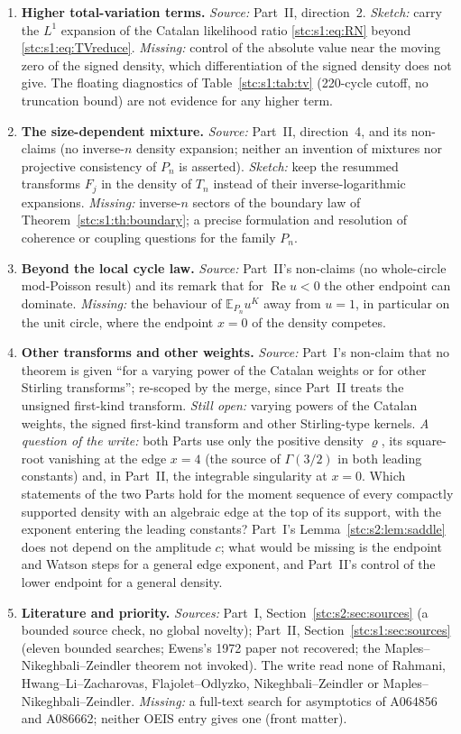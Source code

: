 \documentclass[11pt,letterpaper]{article}
\numberwithin{equation}{section}
\theoremstyle{remark}\newtheorem{remark}[theorem]{Remark}
\newcommand{\E}{\mathbb E}
\DeclareMathOperator{\Rea}{Re}
\begin{document}
\begin{enumerate}
\item\label{stc:q:tv} \textbf{Higher total-variation terms.} \emph{Source:} Part~II, direction~2. \emph{Sketch:} carry the $L^1$ expansion of the Catalan likelihood ratio \eqref{stc:s1:eq:RN} beyond \eqref{stc:s1:eq:TVreduce}. \emph{Missing:} control of the absolute value near the moving zero of the signed density, which differentiation of the signed density does not give. The floating diagnostics of Table~\ref{stc:s1:tab:tv} (220-cycle cutoff, no truncation bound) are not evidence for any higher term.
\item\label{stc:q:boundary} \textbf{The size-dependent mixture.} \emph{Source:} Part~II, direction~4, and its non-claims (no inverse-$n$ density expansion; neither an invention of mixtures nor projective consistency of $P_n$ is asserted). \emph{Sketch:} keep the resummed transforms $F_j$ in the density of $T_n$ instead of their inverse-logarithmic expansions. \emph{Missing:} inverse-$n$ sectors of the boundary law of Theorem~\ref{stc:s1:th:boundary}; a precise formulation and resolution of coherence or coupling questions for the family $P_n$.
\item\label{stc:q:circle} \textbf{Beyond the local cycle law.} \emph{Source:} Part~II's non-claims (no whole-circle mod-Poisson result) and its remark that for $\Rea u<0$ the other endpoint can dominate. \emph{Missing:} the behaviour of $\E_{P_n}u^K$ away from $u=1$, in particular on the unit circle, where the endpoint $x=0$ of the density competes.
\item\label{stc:q:transforms} \textbf{Other transforms and other weights.} \emph{Source:} Part~I's non-claim that no theorem is given ``for a varying power of the Catalan weights or for other Stirling transforms''; re-scoped by the merge, since Part~II treats the unsigned first-kind transform. \emph{Still open:} varying powers of the Catalan weights, the signed first-kind transform and other Stirling-type kernels. \emph{A question of the write:} both Parts use only the positive density $\varrho$, its square-root vanishing at the edge $x=4$ (the source of $\Gamma(3/2)$ in both leading constants) and, in Part~II, the integrable singularity at $x=0$. Which statements of the two Parts hold for the moment sequence of every compactly supported density with an algebraic edge at the top of its support, with the exponent entering the leading constants? Part~I's Lemma~\ref{stc:s2:lem:saddle} does not depend on the amplitude $c$; what would be missing is the endpoint and Watson steps for a general edge exponent, and Part~II's control of the lower endpoint for a general density.
\item\label{stc:q:literature} \textbf{Literature and priority.} \emph{Sources:} Part~I, Section~\ref{stc:s2:sec:sources} (a bounded source check, no global novelty); Part~II, Section~\ref{stc:s1:sec:sources} (eleven bounded searches; Ewens's 1972 paper not recovered; the Maples--Nikeghbali--Zeindler theorem not invoked). The write read none of Rahmani, Hwang--Li--Zacharovas, Flajolet--Odlyzko, Nikeghbali--Zeindler or Maples--Nikeghbali--Zeindler. \emph{Missing:} a full-text search for asymptotics of A064856 and A086662; neither OEIS entry gives one (front matter).
\end{enumerate}
\end{document}
